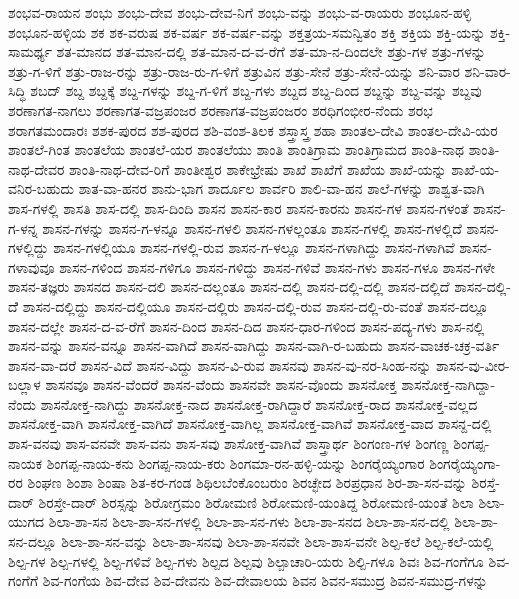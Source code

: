 {ಶಂಭವ-ರಾಯನ
ಶಂಭು
ಶಂಭು-ದೇವ
ಶಂಭು-ದೇವ-ನಿಗೆ
ಶಂಭು-ವನ್ನು
ಶಂಭು-ವ-ರಾಯರು
ಶಂಭೂನ-ಹಳ್ಳಿ
ಶಂಭೂನ-ಹಳ್ಳಿಯ
ಶಕ
ಶಕ-ವರುಷ
ಶಕ-ವರ್ಷ
ಶಕ-ವರ್ಷ-ವನ್ನು
ಶಕ್ತತ್ರಯ-ಸಮನ್ವಿತಂ
ಶಕ್ತಿ
ಶಕ್ತಿಯ
ಶಕ್ತಿ-ಯನ್ನು
ಶಕ್ತಿ-ಸಾಮರ್ಥ್ಯ
ಶತ-ಮಾನದ
ಶತ-ಮಾನ-ದಲ್ಲಿ
ಶತ-ಮಾನ-ದ-ವ-ರೆಗೆ
ಶತ-ಮಾ-ನ-ದಿಂದಲೇ
ಶತ್ರು-ಗಳ
ಶತ್ರು-ಗಳನ್ನು
ಶತ್ರು-ಗ-ಳಿಗೆ
ಶತ್ರು-ರಾಜ-ರನ್ನು
ಶತ್ರು-ರಾಜ-ರು-ಗ-ಳಿಗೆ
ಶತ್ರುವಿನ
ಶತ್ರು-ಸೇನೆ
ಶತ್ರು-ಸೇನೆ-ಯನ್ನು
ಶನಿ-ವಾರ
ಶನಿ-ವಾರ-ಸಿದ್ಧಿ
ಶಬದ್
ಶಬ್ದ
ಶಬ್ದಕ್ಕೆ
ಶಬ್ದ-ಗಳನ್ನು
ಶಬ್ದ-ಗ-ಳಿಗೆ
ಶಬ್ದ-ಗಳು
ಶಬ್ದದ
ಶಬ್ದ-ದಿಂದ
ಶಬ್ದನ್ನು
ಶಬ್ದ-ವನ್ನು
ಶಬ್ದವು
ಶರಣಾಗತ-ನಾಗಲು
ಶರಣಾಗತ-ವಜ್ರಪಂಜರ
ಶರಣಾಗತ-ವಜ್ರಪಂಜರಂ
ಶರಧಿಗಂಭೀರ-ನೆಂದು
ಶರಭ
ಶರಾಗತಮಂದಾರಃ
ಶಶಕ-ಪುರದ
ಶಶ-ಪುರದ
ಶಶಿ-ವಂಶ-ತಿಲಕ
ಶಸ್ತ್ರಾಸ್ತ್ರ
ಶಹಾ
ಶಾಂತಲ-ದೇವಿ
ಶಾಂತಲ-ದೇವಿ-ಯರ
ಶಾಂತಲೆ-ಗಿಂತ
ಶಾಂತಲೆಯ
ಶಾಂತಲೆ-ಯರ
ಶಾಂತಲೆಯು
ಶಾಂತಿ
ಶಾಂತಿಗ್ರಾಮ
ಶಾಂತಿಗ್ರಾಮದ
ಶಾಂತಿ-ನಾಥ
ಶಾಂತಿ-ನಾಥ-ದೇವರ
ಶಾಂತಿ-ನಾಥ-ದೇವ-ರಿಗೆ
ಶಾಂತೀಶ್ವರ
ಶಾಕೇಭ್ರೇಷು
ಶಾಖೆ
ಶಾಖೆಗೆ
ಶಾಖೆಯ
ಶಾಖೆ-ಯನ್ನು
ಶಾಖೆ-ಯ-ವನಿರ-ಬಹುದು
ಶಾತ-ವಾ-ಹನರ
ಶಾನು-ಭಾಗ
ಶಾರ್ದೂಲ
ಶಾರ್ವರಿ
ಶಾಲಿ-ವಾ-ಹನ
ಶಾಲೆ-ಗಳನ್ನು
ಶಾಶ್ವತ-ವಾಗಿ
ಶಾಸ-ಗಳಲ್ಲಿ
ಶಾಸತಿ
ಶಾಸ-ದಲ್ಲಿ
ಶಾಸ-ದಿಂದಿ
ಶಾಸನ
ಶಾಸನ-ಕಾರ
ಶಾಸನ-ಕಾರನು
ಶಾಸನ-ಗಳ
ಶಾಸನ-ಗಳಂತೆ
ಶಾಸನ-ಗ-ಳನ್ನ
ಶಾಸನ-ಗಳನ್ನು
ಶಾಸನ-ಗ-ಳನ್ನೂ
ಶಾಸನ-ಗಳಲಿ
ಶಾಸನ-ಗಳಲ್ಲಂತೂ
ಶಾಸನ-ಗಳಲ್ಲಿ
ಶಾಸನ-ಗಳಲ್ಲಿದೆ
ಶಾಸನ-ಗಳಲ್ಲಿದ್ದು
ಶಾಸನ-ಗಳಲ್ಲಿಯೂ
ಶಾಸನ-ಗಳಲ್ಲಿ-ರುವ
ಶಾಸನ-ಗ-ಳಲ್ಲೂ
ಶಾಸನ-ಗಳಾಗಿದ್ದು
ಶಾಸನ-ಗಳಾಗಿವೆ
ಶಾಸನ-ಗಳಾವುವೂ
ಶಾಸನ-ಗಳಿಂದ
ಶಾಸನ-ಗಳಿಗೂ
ಶಾಸನ-ಗಳಿದ್ದು
ಶಾಸನ-ಗಳಿವೆ
ಶಾಸನ-ಗಳು
ಶಾಸನ-ಗಳೂ
ಶಾಸನ-ಗಳೇ
ಶಾಸನ-ತಜ್ಞರು
ಶಾಸನದ
ಶಾಸನ-ದಲಿ
ಶಾಸನ-ದಲ್ಲಂತೂ
ಶಾಸನ-ದಲ್ಲಿ
ಶಾಸನ-ದಲ್ಲಿ-ದಲ್ಲಿ
ಶಾಸನ-ದಲ್ಲಿದೆ
ಶಾಸನ-ದಲ್ಲಿ-ದೆೆ
ಶಾಸನ-ದಲ್ಲಿದ್ದು
ಶಾಸನ-ದಲ್ಲಿಯೂ
ಶಾಸನ-ದಲ್ಲಿರು
ಶಾಸನ-ದಲ್ಲಿ-ರುವ
ಶಾಸನ-ದಲ್ಲಿ-ರು-ವಂತೆ
ಶಾಸನ-ದಲ್ಲೂ
ಶಾಸನ-ದಲ್ಲೇ
ಶಾಸನ-ದ-ವ-ರೆಗೆ
ಶಾಸನ-ದಿಂದ
ಶಾಸನ-ದಿದ
ಶಾಸನ-ಧಾರ-ಗಳಿಂದ
ಶಾಸನ-ಪದ್ಯ-ಗಳು
ಶಾಸ-ನಲ್ಲಿ
ಶಾಸನ-ವನ್ನು
ಶಾಸನ-ವನ್ನೂ
ಶಾಸನ-ವಾಗಿದೆ
ಶಾಸನ-ವಾಗಿದ್ದು
ಶಾಸನ-ವಾಗಿ-ರ-ಬಹುದು
ಶಾಸನ-ವಾಚಕ-ಚಕ್ರ-ವರ್ತಿ
ಶಾಸನ-ವಾ-ದರೆ
ಶಾಸನ-ವಿದೆ
ಶಾಸನ-ವಿದ್ದು
ಶಾಸನ-ವಿ-ರುವ
ಶಾಸನವು
ಶಾಸನ-ವು-ನರ-ಸಿಂಹ-ನನ್ನು
ಶಾಸನ-ವು-ವೀರ-ಬಲ್ಲಾಳ
ಶಾಸನವೂ
ಶಾಸನ-ವೆಂದರೆ
ಶಾಸನ-ವೆಂದು
ಶಾಸನವೇ
ಶಾಸನ-ವೊಂದು
ಶಾಸನೋಕ್ತ
ಶಾಸನೋಕ್ತ-ನಾಗಿದ್ದಾ-ನೆಂದು
ಶಾಸನೋಕ್ತ-ನಾಗಿದ್ದು
ಶಾಸನೋಕ್ತ-ನಾದ
ಶಾಸನೋಕ್ತ-ರಾಗಿದ್ದಾರೆ
ಶಾಸನೋಕ್ತ-ರಾದ
ಶಾಸನೋಕ್ತ-ವಲ್ಲದ
ಶಾಸನೋಕ್ತ-ವಾಗಿ
ಶಾಸನೋಕ್ತ-ವಾಗಿದೆ
ಶಾಸನೋಕ್ತ-ವಾಗಿಲ್ಲ
ಶಾಸನೋಕ್ತ-ವಾಗಿವೆ
ಶಾಸನೋಕ್ತ-ವಾದ
ಶಾಸನ್ದ-ದಲ್ಲಿ
ಶಾಸ-ವನವು
ಶಾಸ-ವನವೇ
ಶಾಸ-ವನು
ಶಾಸ-ಸವು
ಶಾಸೋಕ್ತ-ವಾಗಿವೆ
ಶಾಸ್ತ್ರಾರ್ಥ
ಶಿಂಗಂಣ-ಗಳ
ಶಿಂಗಣ್ಣ
ಶಿಂಗಪ್ಪ-ನಾಯಕ
ಶಿಂಗಪ್ಪ-ನಾಯ-ಕನು
ಶಿಂಗಪ್ಪ-ನಾಯ-ಕರು
ಶಿಂಗಮಾ-ರನ-ಹಳ್ಳಿ-ಯನ್ನು
ಶಿಂಗರೈಯ್ಯಂಗಾರ
ಶಿಂಗರೈಯ್ಯಂಗಾ-ರರ
ಶಿಂಘಣ
ಶಿಂಶಾ
ಶಿಂಷಾ
ಶಿತ-ಕರ-ಗಂಡ
ಶಿಥಿಲಬೆಂಕೊಂಬರುಂ
ಶಿರಚ್ಛೇದ
ಶಿರಪ್ರಧಾನ
ಶಿರ-ಶಾ-ಸನ-ವನ್ನು
ಶಿರಸ್ತೆ-ದಾರ್
ಶಿರಸ್ತೇ-ದಾರ್
ಶಿರಸ್ಸನ್ನು
ಶಿರೋಗ್ರಮಂ
ಶಿರೋಮಣಿ
ಶಿರೋಮಣಿ-ಯಂತಿದ್ದ
ಶಿರೋಮಣಿ-ಯಂತೆ
ಶಿಲಾ
ಶಿಲಾ-ಯುಗದ
ಶಿಲಾ-ಶಾ-ಸನ
ಶಿಲಾ-ಶಾ-ಸನ-ಗಳಲ್ಲಿ
ಶಿಲಾ-ಶಾ-ಸನ-ಗಳು
ಶಿಲಾ-ಶಾ-ಸನದ
ಶಿಲಾ-ಶಾ-ಸನ-ದಲ್ಲಿ
ಶಿಲಾ-ಶಾ-ಸನ-ದಲ್ಲೂ
ಶಿಲಾ-ಶಾ-ಸನ-ವನ್ನು
ಶಿಲಾ-ಶಾ-ಸನವು
ಶಿಲಾ-ಶಾ-ಸನವೇ
ಶಿಲಾ-ಶಾಸ-ವನೇ
ಶಿಲ್ಪ-ಕಲೆ
ಶಿಲ್ಪ-ಕಲೆ-ಯಲ್ಲಿ
ಶಿಲ್ಪ-ಗಳ
ಶಿಲ್ಪ-ಗಳಲ್ಲಿ
ಶಿಲ್ಪ-ಗಳಿವೆ
ಶಿಲ್ಪ-ಗಳು
ಶಿಲ್ಪದ
ಶಿಲ್ಪವು
ಶಿಲ್ಪಾಚಾರಿ-ಯರು
ಶಿಲ್ಪಿ-ಗಳೂ
ಶಿವಃ
ಶಿವ-ಗಂಗೆಗೂ
ಶಿವ-ಗಂಗೆಗೆ
ಶಿವ-ಗಂಗೆಯ
ಶಿವ-ದೇವ
ಶಿವ-ದೇವನು
ಶಿವ-ದೇವಾಲಯ
ಶಿವನ
ಶಿವನ-ಸಮುದ್ರ
ಶಿವನ-ಸಮುದ್ರ-ಗಳನ್ನು
}

